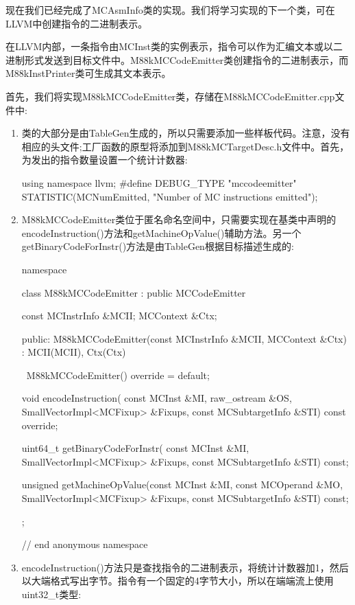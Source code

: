现在我们已经完成了MCAsmInfo类的实现。我们将学习实现的下一个类，可在LLVM中创建指令的二进制表示。


在LLVM内部，一条指令由MCInst类的实例表示，指令可以作为汇编文本或以二进制形式发送到目标文件中。M88kMCCodeEmitter类创建指令的二进制表示，而M88kInstPrinter类可生成其文本表示。

首先，我们将实现M88kMCCodeEmitter类，存储在M88kMCCodeEmitter.cpp文件中:

\begin{enumerate}
\item
类的大部分是由TableGen生成的，所以只需要添加一些样板代码。注意，没有相应的头文件;工厂函数的原型将添加到M88kMCTargetDesc.h文件中。首先，为发出的指令数量设置一个统计计数器:

\begin{cpp}
using namespace llvm;
#define DEBUG_TYPE "mccodeemitter"
STATISTIC(MCNumEmitted,
          "Number of MC instructions emitted");
\end{cpp}

\item
M88kMCCodeEmitter类位于匿名命名空间中，只需要实现在基类中声明的encodeInstruction()方法和getMachineOpValue()辅助方法。另一个getBinaryCodeForInstr()方法是由TableGen根据目标描述生成的:

\begin{cpp}
namespace {
class M88kMCCodeEmitter : public MCCodeEmitter {
    const MCInstrInfo &MCII;
    MCContext &Ctx;

public:
    M88kMCCodeEmitter(const MCInstrInfo &MCII,
                      MCContext &Ctx)
    : MCII(MCII), Ctx(Ctx) {}

    ~M88kMCCodeEmitter() override = default;

    void encodeInstruction(
        const MCInst &MI, raw_ostream &OS,
        SmallVectorImpl<MCFixup> &Fixups,
        const MCSubtargetInfo &STI) const override;

    uint64_t getBinaryCodeForInstr(
        const MCInst &MI,
        SmallVectorImpl<MCFixup> &Fixups,
        const MCSubtargetInfo &STI) const;

    unsigned
    getMachineOpValue(const MCInst &MI,
                        const MCOperand &MO,
                        SmallVectorImpl<MCFixup> &Fixups,
                        const MCSubtargetInfo &STI) const;
};
} // end anonymous namespace
\end{cpp}

\item
encodeInstruction()方法只是查找指令的二进制表示，将统计计数器加1，然后以大端格式写出字节。指令有一个固定的4字节大小，所以在端端流上使用uint32\_t类型:


\end{enumerate}
